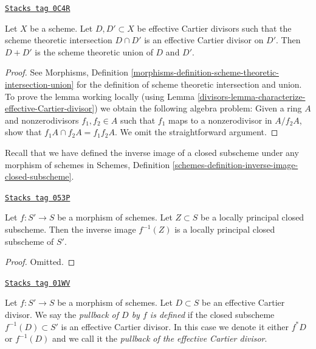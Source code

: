 \begin{lemma}
\label{divisors-lemma-sum-effective-Cartier-divisors-union}
\href{https://stacks.math.columbia.edu/tag/0C4R}{\texttt{Stacks tag 0C4R}}

Let $X$ be a scheme. Let $D, D' \subset X$ be effective Cartier divisors
such that the scheme theoretic intersection $D \cap D'$ is an effective
Cartier divisor on $D'$. Then $D + D'$ is the scheme theoretic
union of $D$ and $D'$.
\end{lemma}

\begin{proof}

See Morphisms, Definition
\ref{morphisms-definition-scheme-theoretic-intersection-union}
for the definition of scheme theoretic intersection and union.
To prove the lemma working locally
(using Lemma \ref{divisors-lemma-characterize-effective-Cartier-divisor})
we obtain the following algebra problem: Given a ring $A$
and nonzerodivisors $f_1, f_2 \in A$ such that $f_1$ maps
to a nonzerodivisor in $A/f_2A$, show that $f_1A \cap f_2A = f_1f_2A$.
We omit the straightforward argument.
\end{proof}

Recall that we have defined the inverse image of a closed subscheme
under any morphism of schemes in
Schemes, Definition \ref{schemes-definition-inverse-image-closed-subscheme}.

\begin{lemma}
\label{divisors-lemma-pullback-locally-principal}
\href{https://stacks.math.columbia.edu/tag/053P}{\texttt{Stacks tag 053P}}

Let $f : S' \to S$ be a morphism of schemes. Let $Z \subset S$
be a locally principal closed subscheme. Then the inverse image
$f^{-1}(Z)$ is a locally principal closed subscheme of $S'$.
\end{lemma}

\begin{proof}
Omitted.
\end{proof}

\begin{definition}
\label{divisors-definition-pullback-effective-Cartier-divisor}
\href{https://stacks.math.columbia.edu/tag/01WV}{\texttt{Stacks tag 01WV}}

Let $f : S' \to S$ be a morphism of schemes. Let $D \subset S$
be an effective Cartier divisor. We say the {\it pullback of
$D$ by $f$ is defined} if the closed subscheme $f^{-1}(D) \subset S'$
is an effective Cartier divisor. In this case we denote it either
$f^*D$ or $f^{-1}(D)$ and we call it the
{\it pullback of the effective Cartier divisor}.
\end{definition}

